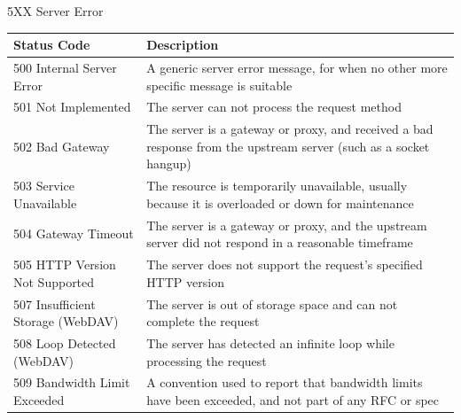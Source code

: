 \documentclass[final,table]{beamer}
\begin{document}
\begin{frame}{}
\begin{block}{\huge 5XX Server Error}
      \begin{tabular}{p{} p{}}
        Status Code & Description \\ \hline
        500 Internal Server Error & A generic server error message, for when no other more specific message is suitable \\
        501 Not Implemented & The server can not process the request method \\
        502 Bad Gateway & The server is a gateway or proxy, and received a bad response from the upstream server (such as a socket hangup) \\
        503 Service Unavailable & The resource is temporarily unavailable, usually because it is overloaded or down for maintenance \\
        504 Gateway Timeout & The server is a gateway or proxy, and the upstream server did not respond in a reasonable timeframe \\
        505 HTTP Version Not Supported & The server does not support the request's specified HTTP version \\
        507 Insufficient Storage (WebDAV) & The server is out of storage space and can not complete the request \\
        508 Loop Detected (WebDAV) & The server has detected an infinite loop while processing the request \\
        509 Bandwidth Limit Exceeded & A convention used to report that bandwidth limits have been exceeded, and not part of any RFC or spec \\
      \end{tabular}
    \end{block}
  \end{frame}
\end{document}

